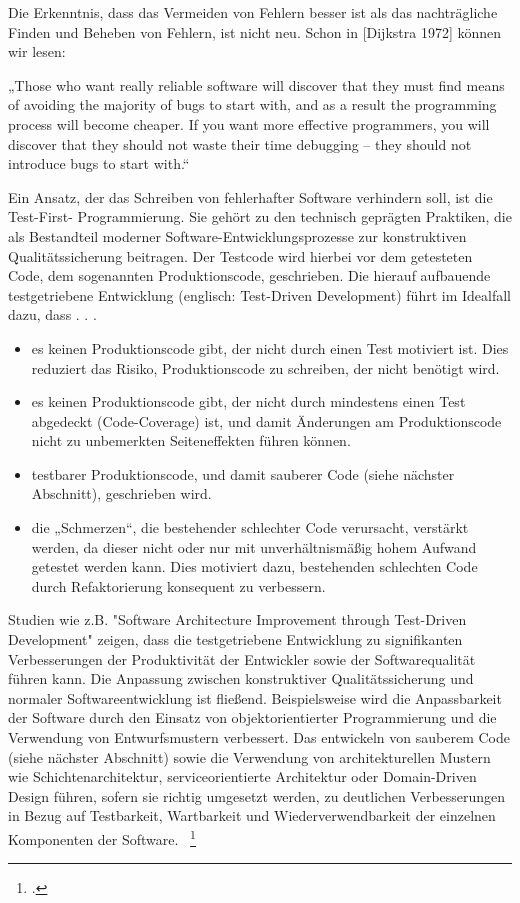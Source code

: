 Die Erkenntnis, dass das Vermeiden von Fehlern besser ist als das nachträgliche Finden
und Beheben von Fehlern, ist nicht neu. Schon in [Dijkstra 1972] können wir lesen:

„Those who want really reliable software will discover that they must find means of
avoiding the majority of bugs to start with, and as a result the programming process
will become cheaper. If you want more effective programmers, you will discover that
they should not waste their time debugging – they should not introduce bugs to start
with.“

Ein Ansatz, der das Schreiben von fehlerhafter Software verhindern soll, ist die Test-First-
Programmierung. Sie gehört zu den technisch geprägten Praktiken, die als Bestandteil moderner 
Software-Entwicklungsprozesse zur konstruktiven Qualitätssicherung beitragen.
Der Testcode wird hierbei vor dem getesteten Code, dem sogenannten Produktionscode,
geschrieben. Die hierauf aufbauende testgetriebene Entwicklung (englisch: Test-Driven
Development) führt im Idealfall dazu, dass . . .
\begin{itemize}
	\item es keinen Produktionscode gibt, der nicht durch einen Test motiviert ist. Dies reduziert das Risiko, Produktionscode zu schreiben, der nicht benötigt wird.

	\item  es keinen Produktionscode gibt, der nicht durch mindestens einen Test abgedeckt (Code-Coverage) ist, und damit Änderungen am Produktionscode nicht zu unbemerkten Seiteneffekten führen können.

	\item testbarer Produktionscode, und damit sauberer Code (siehe nächster Abschnitt), geschrieben wird.

	\item die „Schmerzen“, die bestehender schlechter Code verursacht, verstärkt werden, da dieser nicht oder nur mit unverhältnismäßig hohem Aufwand getestet werden kann. Dies motiviert dazu, bestehenden schlechten Code durch Refaktorierung konsequent zu verbessern.
\end{itemize}

Studien wie z.B. "Software Architecture Improvement through Test-Driven Development" zeigen, dass die testgetriebene 
Entwicklung zu signifikanten Verbesserungen der Produktivität der Entwickler sowie der Softwarequalität führen kann. 
Die Anpassung zwischen konstruktiver Qualitätssicherung und normaler Softwareentwicklung ist fließend. Beispielsweise wird die Anpassbarkeit 
der Software durch den Einsatz von objektorientierter Programmierung und die Verwendung von 
Entwurfsmustern verbessert. Das entwickeln von sauberem Code (siehe nächster Abschnitt) sowie die Verwendung 
von architekturellen Mustern wie Schichtenarchitektur, serviceorientierte Architektur oder Domain-Driven Design 
führen, sofern sie richtig umgesetzt werden, zu deutlichen Verbesserungen in Bezug auf Testbarkeit, Wartbarkeit 
und Wiederverwendbarkeit der einzelnen Komponenten der Software. ~\footcite[Vgl.]{Janzen.2006}

